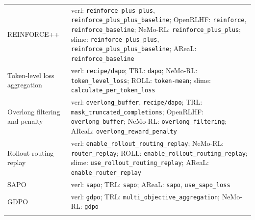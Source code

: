 \begin{tabularx}{\linewidth}{>{\raggedright\arraybackslash}p{3.2cm} >{\raggedright\arraybackslash}X}
REINFORCE++ & verl: \texttt{reinforce\_plus\_plus}, \texttt{reinforce\_plus\_plus\_baseline}; OpenRLHF: \texttt{reinforce}, \texttt{reinforce\_baseline}; NeMo-RL: \texttt{reinforce\_plus\_plus}; slime: \texttt{reinforce\_plus\_plus}, \texttt{reinforce\_plus\_plus\_baseline}; AReaL: \texttt{reinforce\_baseline} \\ \addlinespace[3pt]
Token-level loss aggregation & verl: \texttt{recipe/dapo}; TRL: \texttt{dapo}; NeMo-RL: \texttt{token\_level\_loss}; ROLL: \texttt{token-mean}; slime: \texttt{calculate\_per\_token\_loss} \\ \addlinespace[3pt]
Overlong filtering and penalty & verl: \texttt{overlong\_buffer}, \texttt{recipe/dapo}; TRL: \texttt{mask\_truncated\_completions}; OpenRLHF: \texttt{overlong\_buffer}; NeMo-RL: \texttt{overlong\_filtering}; AReaL: \texttt{overlong\_reward\_penalty} \\ \addlinespace[3pt]
Rollout routing replay & verl: \texttt{enable\_rollout\_routing\_replay}; NeMo-RL: \texttt{router\_replay}; ROLL: \texttt{enable\_rollout\_routing\_replay}; slime: \texttt{use\_rollout\_routing\_replay}; AReaL: \texttt{enable\_router\_replay} \\ \addlinespace[3pt]
SAPO & verl: \texttt{sapo}; TRL: \texttt{sapo}; AReaL: \texttt{sapo}, \texttt{use\_sapo\_loss} \\ \addlinespace[3pt]
GDPO & verl: \texttt{gdpo}; TRL: \texttt{multi\_objective\_aggregation}; NeMo-RL: \texttt{gdpo} \\ \addlinespace[3pt]
\bottomrule
\end{tabularx}
